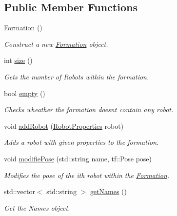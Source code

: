\subsection*{Public Member Functions}
\begin{DoxyCompactItemize}
\item 
\hyperlink{classFormation_a60c3058dd353550d89183ec529909cb6}{Formation} ()\hypertarget{classFormation_a60c3058dd353550d89183ec529909cb6}{}\label{classFormation_a60c3058dd353550d89183ec529909cb6}

\begin{DoxyCompactList}\small\item\em Construct a new \hyperlink{classFormation}{Formation} object. \end{DoxyCompactList}\item 
int \hyperlink{classFormation_ae2112756bd93d96fe630f2ef03296cd8}{size} ()
\begin{DoxyCompactList}\small\item\em Gets the number of Robots within the formation. \end{DoxyCompactList}\item 
bool \hyperlink{classFormation_a9e7daefe97ed604263d43ecc1c60998e}{empty} ()
\begin{DoxyCompactList}\small\item\em Checks wheather the formation doesnt contain any robot. \end{DoxyCompactList}\item 
void \hyperlink{classFormation_a2e905a5a990cc2eb9a67f0af772c8437}{add\+Robot} (\hyperlink{structFormation_1_1RobotProperties}{Robot\+Properties} robot)
\begin{DoxyCompactList}\small\item\em Adds a robot with given properties to the formation. \end{DoxyCompactList}\item 
void \hyperlink{classFormation_a18eb5684d095d131c1df1df469bd9cc6}{modifie\+Pose} (std\+::string name, tf\+::\+Pose pose)
\begin{DoxyCompactList}\small\item\em Modifies the pose of the ith robot within the \hyperlink{classFormation}{Formation}. \end{DoxyCompactList}\item 
std\+::vector$<$ std\+::string $>$ \hyperlink{classFormation_a7eadb61f6058458c881e22cae4244f91}{get\+Names} ()
\begin{DoxyCompactList}\small\item\em Get the Names object. \end{DoxyCompactList}\item 

\end{DoxyCompactItemize}
